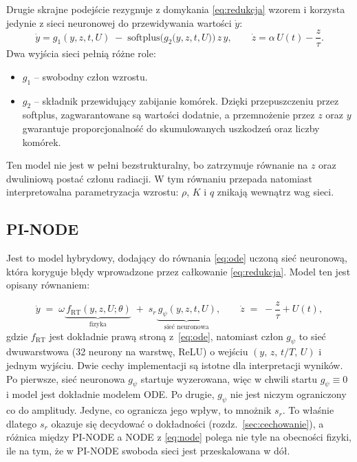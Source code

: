 \documentclass[11pt,a4paper]{article}
\begin{document}
Drugie skrajne podejście rezygnuje z domykania \eqref{eq:redukcja} wzorem i korzysta jedynie z sieci neuronowej do przewidywania wartości $\dot{y}$:
\begin{equation}
\dot y = g_1(y,z,t,U) \;-\; \mathrm{softplus}\Big(g_2\big(y,z,t,U\big)\Big)\,z\,y ,
\qquad
\dot z = \alpha\,U(t) - \frac{z}{\tau}.
\label{eq:node}
\end{equation}
Dwa wyjścia sieci pełnią różne role: 
\begin{itemize}
    \item $g_1$ -- swobodny człon wzrostu.
    \item $g_2$ -- składnik przewidujący zabijanie komórek. Dzięki przepuszczeniu przez softplus, zagwarantowane są wartości dodatnie, a przemnożenie przez $z$ oraz $y$ gwarantuje proporcjonalność do skumulowanych uszkodzeń oraz liczby komórek.
\end{itemize}
Ten model nie jest w pełni bezstrukturalny, bo zatrzymuje równanie na
$z$ oraz dwuliniową postać członu radiacji. W tym równaniu przepada natomiast
interpretowalna parametryzacja wzrostu: $\rho$, $K$ i $q$ znikają wewnątrz wag sieci.

\subsection{PI-NODE}
\label{sec:model-pinode}

Jest to model hybrydowy, dodający do równania \eqref{eq:ode} uczoną sieć neuronową, która koryguje błędy wprowadzone przez całkowanie \eqref{eq:redukcja}. Model ten jest opisany równaniem:

\begin{equation}
\dot y \;=\; \omega\underbrace{\, f_{\mathrm{RT}}(y,z,U;\theta)}_{\text{fizyka}}
\;+\; s_r\underbrace{\, g_{\psi}(y,z,t,U)}_{\text{sieć neuronowa}},
\qquad
\dot z \;=\; -\frac{z}{\tau} + U(t),
\label{eq:pinode}
\end{equation}
gdzie $f_{\mathrm{RT}}$ jest dokładnie prawą stroną
z~\eqref{eq:ode}, natomiast człon $g_\psi$ to sieć dwuwarstwowa (32 neurony na warstwę, ReLU)
o wejściu $(y,\,z,\,t/T,\,U)$ i jednym wyjściu. Dwie cechy implementacji są istotne dla interpretacji wyników. Po pierwsze, sieć neuronowa $g_\psi$ startuje wyzerowana, więc w chwili startu $g_\psi \equiv 0$ i model jest
dokładnie modelem ODE. Po drugie, $g_\psi$ nie jest niczym ograniczony co do amplitudy. Jedyne, co
ogranicza jego wpływ, to mnożnik $s_r$. To właśnie dlatego $s_r$ okazuje się decydować
o dokładności (rozdz.~\ref{sec:cechowanie}), a różnica między PI-NODE a NODE
z \eqref{eq:node} polega nie tyle na obecności fizyki, ile na tym, że w PI-NODE swoboda
sieci jest przeskalowana w dół.
\end{document}
